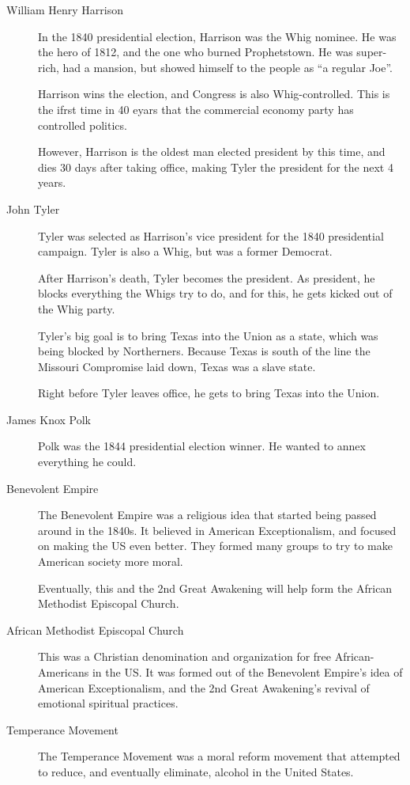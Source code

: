 \begin{description}
\item[William Henry Harrison] In the 1840 presidential election, Harrison was the Whig nominee.
  He was the hero of 1812, and the one who burned Prophetstown.
  He was super-rich, had a mansion, but showed himself to the people as ``a regular Joe''.

  Harrison wins the election, and Congress is also Whig-controlled.
  This is the ifrst time in 40 eyars that the commercial economy party has controlled politics.

  However, Harrison is the oldest man elected president by this time, and dies 30 days after taking office, making Tyler the president for the next 4 years.

\item[John Tyler] Tyler was selected as Harrison's vice president for the 1840 presidential campaign.
  Tyler is also a Whig, but was a former Democrat.

  After Harrison's death, Tyler becomes the president.
  As president, he blocks everything the Whigs try to do, and for this, he gets kicked out of the Whig party.

  Tyler's big goal is to bring Texas into the Union as a state, which was being blocked by Northerners.
  Because Texas is south of the line the Missouri Compromise laid down, Texas was a slave state.

  Right before Tyler leaves office, he gets to bring Texas into the Union.

\item[James Knox Polk] Polk was the 1844 presidential election winner.
  He wanted to annex everything he could.

\item[Benevolent Empire] The Benevolent Empire was a religious idea that started being passed around in the 1840s.
  It believed in American Exceptionalism, and focused on making the US even better.
  They formed many groups to try to make American society more moral.

  Eventually, this and the 2nd Great Awakening will help form the African Methodist Episcopal Church.

\item[African Methodist Episcopal Church] This was a Christian denomination and organization for free African-Americans in the US.\@
  It was formed out of the Benevolent Empire's idea of American Exceptionalism, and the 2nd Great Awakening's revival of emotional spiritual practices.

\item[Temperance Movement] The Temperance Movement was a moral reform movement that attempted to reduce, and eventually eliminate, alcohol in the United States.


\end{description}

